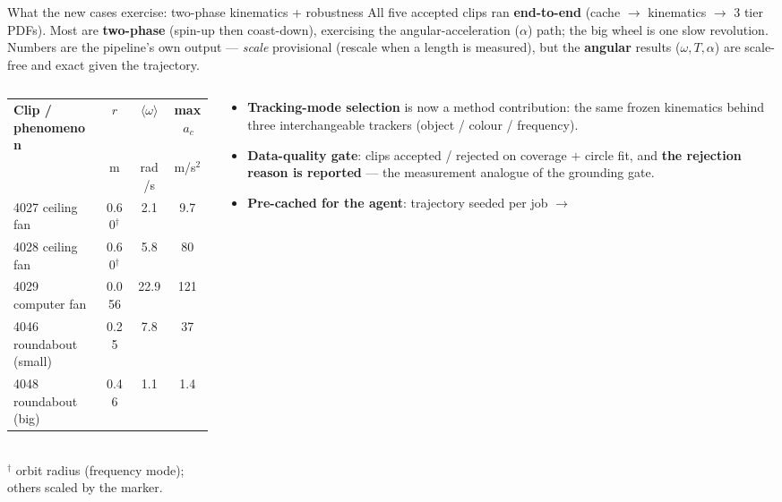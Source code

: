 \documentclass[aspectratio=169,10pt]{beamer}
\newcommand{\hl}[1]{{\bfseries\color{cAccent}#1}}
\begin{document}
\begin{frame}{What the new cases exercise: two-phase kinematics + robustness}
\scriptsize
All five accepted clips ran \textbf{end-to-end} (cache $\to$ kinematics $\to$ 3 tier PDFs). Most
are \textbf{two-phase} (spin-up then coast-down), exercising the angular-acceleration ($\alpha$)
path; the big wheel is one slow revolution. Numbers are the pipeline's own output --- \emph{scale}
provisional (rescale when a length is measured), but the \textbf{angular} results ($\omega,T,\alpha$)
are scale-free and exact given the trajectory.
\vspace{0.3em}
\renewcommand{\arraystretch}{1.2}
\begin{columns}[T]
\begin{column}{0.54\textwidth}
\begin{tabular}{@{}p{2.7cm}ccc@{}}
\toprule
\textbf{Clip / phenomenon} & \textbf{$r$} & \textbf{$\langle\omega\rangle$} & \textbf{max\,$a_c$} \\
& {\tiny m} & {\tiny rad/s} & {\tiny m/s$^2$} \\
\midrule
\rowcolor{cMeas!8}4027 ceiling fan & 0.60$^\dagger$ & 2.1 & 9.7 \\
\rowcolor{cMeas!8}4028 ceiling fan & 0.60$^\dagger$ & 5.8 & 80 \\
4029 computer fan & 0.056 & 22.9 & 121 \\
\rowcolor{cApp!8}4046 roundabout\,(small) & 0.25 & 7.8 & 37 \\
\rowcolor{cApp!8}4048 roundabout\,(big) & 0.46 & 1.1 & 1.4 \\
\bottomrule
\end{tabular}\\[2pt]
{\tiny $^\dagger$ orbit radius (frequency mode); others scaled by the marker.}
\end{column}
\begin{column}{0.46\textwidth}
\begin{itemize}\setlength\itemsep{2pt}
  \item \textbf{\color{cMeas}Tracking-mode selection} is now a method contribution: the same
  frozen kinematics behind three interchangeable trackers (object / colour / frequency).
  \item \textbf{\color{cPed}Data-quality gate}: clips accepted / rejected on coverage $+$ circle
  fit, and \hl{the rejection reason is reported} --- the measurement analogue of the grounding gate.
  \item \textbf{\color{cApp}Pre-cached for the agent}: trajectory seeded per job $\rightarrow$

\end{itemize}
\end{column}
\end{columns}
\end{frame}
\end{document}
